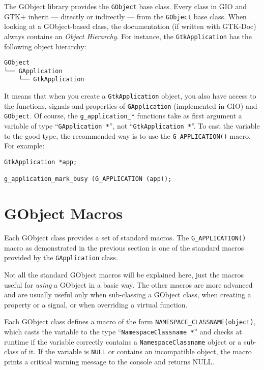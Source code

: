 The GObject library provides the \lstinline{GObject} base class. Every class in GIO and GTK+ inherit --- directly or indirectly --- from the \lstinline{GObject} base class. When looking at a GObject-based class, the documentation (if written with GTK-Doc) always contains an \emph{Object Hierarchy}. For instance, the \lstinline{GtkApplication} has the following object hierarchy:

\begin{verbatim}
GObject
└── GApplication
    └── GtkApplication
\end{verbatim}

It means that when you create a \lstinline{GtkApplication} object, you also have access to the functions, signals and properties of \lstinline{GApplication} (implemented in GIO) and \lstinline{GObject}. Of course, the \lstinline{g_application_*} functions take as first argument a variable of type ``\lstinline{GApplication *}'', not ``\lstinline{GtkApplication *}''. To cast the variable to the good type, the recommended way is to use the \lstinline{G_APPLICATION()} macro. For example:

\begin{lstlisting}
GtkApplication *app;

g_application_mark_busy (G_APPLICATION (app));
\end{lstlisting}

\section{GObject Macros}

Each GObject class provides a set of standard macros. The \lstinline{G_APPLICATION()} macro as demonstrated in the previous section is one of the standard macros provided by the \lstinline{GApplication} class.

Not all the standard GObject macros will be explained here, just the macros useful for \emph{using} a GObject in a basic way. The other macros are more advanced and are usually useful only when sub-classing a GObject class, when creating a property or a signal, or when overriding a virtual function.

Each GObject class defines a macro of the form \lstinline{NAMESPACE_CLASSNAME(object)}, which casts the variable to the type ``\lstinline{NamespaceClassname *}'' and checks at runtime if the variable correctly contains a \lstinline{NamespaceClassname} object or a sub-class of it. If the variable is \lstinline{NULL} or contains an incompatible object, the macro prints a critical warning message to the console and returns NULL.

